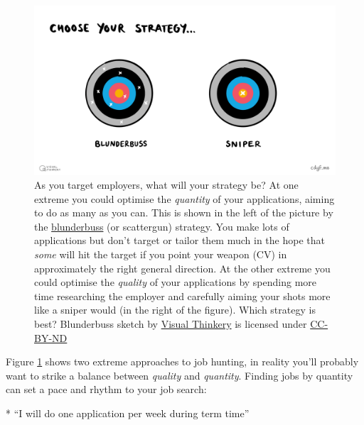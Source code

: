 \documentclass[
]{book}
\newenvironment{Shaded}{\begin{snugshade}}{\end{snugshade}}
\newcommand{\NormalTok}[1]{#1}
\newcommand{\SpecialStringTok}[1]{\textcolor[rgb]{0.31,0.60,0.02}{#1}}
\begin{document}
\begin{figure}

{\centering \includegraphics[width=1\linewidth]{images/Blunderbuss} 

}

\caption{As you target employers, what will your strategy be? At one extreme you could optimise the \emph{quantity} of your applications, aiming to do as many as you can. This is shown in the left of the picture by the \href{https://en.wikipedia.org/wiki/Blunderbuss}{blunderbuss} (or scattergun) strategy. You make lots of applications but don't target or tailor them much in the hope that \emph{some} will hit the target if you point your weapon (CV) in approximately the right general direction. At the other extreme you could optimise the \emph{quality} of your applications by spending more time researching the employer and carefully aiming your shots more like a sniper would (in the right of the figure). Which strategy is best? Blunderbuss sketch by \href{https://visualthinkery.com/}{Visual Thinkery} is licensed under \href{https://creativecommons.org/licenses/by-nd/4.0/}{CC-BY-ND}}\label{fig:blunderbuss-fig}
\end{figure}



Figure \ref{fig:blunderbuss-fig} shows two extreme approaches to job hunting, in reality you'll probably want to strike a balance between \emph{quality} and \emph{quantity}. Finding jobs by quantity can set a pace and rhythm to your job search:

\begin{Shaded}
\begin{Highlighting}[]
\SpecialStringTok{* }\NormalTok{“I will do one application per week during term time”}
\end{Highlighting}
\end{Shaded}
\end{document}

